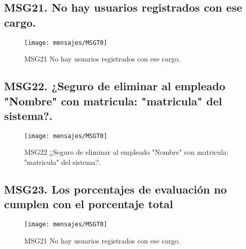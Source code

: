 \subsection{MSG21. No hay usuarios registrados con ese cargo.}
    \begin{figure}[htbp]
        \begin{center}
            \texttt{[image: mensajes/MSGT0]}
            \caption{ MSG21 No hay usuarios registrados con ese cargo.}
            \label{fig:MSG21}
        \end{center}
    \end{figure}


\subsection{MSG22. ¿Seguro de eliminar al empleado "Nombre" con matricula: "matricula" del sistema?.}
    \begin{figure}[htbp]
        \begin{center}
            \texttt{[image: mensajes/MSGT0]}
            \caption{MSG22 ¿Seguro de eliminar al empleado "Nombre" con matricula: "matricula" del sistema?.}
            \label{fig:MSG22}
        \end{center}
    \end{figure}
    
\subsection{MSG23. Los porcentajes de evaluación no cumplen con el porcentaje total}
    \begin{figure}[htbp]
        \begin{center}
            \texttt{[image: mensajes/MSGT0]}
            \caption{ MSG21 No hay usuarios registrados con ese cargo.}
            \label{fig:MSG21}
        \end{center}
    \end{figure}
